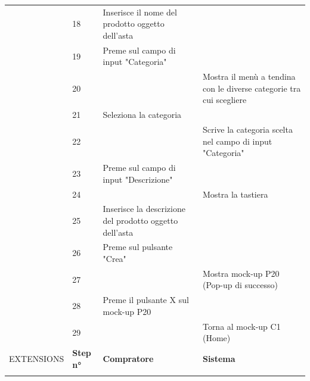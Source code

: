 \begin{longtable}{|C{3.0cm}|C{1.3cm}|L{5.2cm}|L{5.2cm}|}
                        & 18
                        & Inserisce il nome del prodotto oggetto dell'asta
                        & \\
                        & 19
                        & Preme sul campo di input "Categoria"
                        & \\
                        & 20
                        &
                        & Mostra il menù a tendina con le diverse categorie tra cui scegliere \\
                        & 21
                        & Seleziona la categoria
                        & \\
                        & 22
                        & 
                        & Scrive la categoria scelta nel campo di input "Categoria"\\
                        & 23
                        & Preme sul campo di input "Descrizione"
                        & \\
                        & 24
                        &
                        & Mostra la tastiera \\
                        & 25
                        & Inserisce la descrizione del prodotto oggetto dell'asta
                        & \\
                        & 26
                        & Preme sul pulsante "Crea"
                        & \\
                        & 27
                        & 
                        & Mostra mock-up P20 (Pop-up di successo)\\
                        & 28
                        & Preme il pulsante X sul mock-up P20
                        & \\
                        & 29
                        & 
                        & Torna al mock-up C1 (Home)\\
                \hline
                    EXTENSIONS
                    & \textbf{Step n°} 
                    & \textbf{Compratore} 
                    & \textbf{Sistema}\\
                \hline

\end{longtable}
